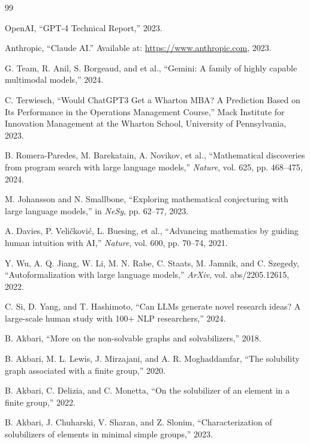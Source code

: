 \documentclass{article}
\begin{document}
\begin{thebibliography}{99}

OpenAI, “GPT-4 Technical Report,” 2023.

Anthropic, “Claude AI.” Available at: \url{https://www.anthropic.com}, 2023.

G. Team, R. Anil, S. Borgeaud, and et al., “Gemini: A family of highly capable multimodal models,” 2024.

C. Terwiesch, “Would ChatGPT3 Get a Wharton MBA? A Prediction Based on Its Performance in the Operations Management Course,” Mack Institute for Innovation Management at the Wharton School, University of Pennsylvania, 2023.

B. Romera-Paredes, M. Barekatain, A. Novikov, et al., “Mathematical discoveries from program search with large language models,” \emph{Nature}, vol. 625, pp. 468–475, 2024.

M. Johansson and N. Smallbone, “Exploring mathematical conjecturing with large language models,” in \emph{NeSy}, pp. 62–77, 2023.

A. Davies, P. Veličković, L. Buesing, et al., “Advancing mathematics by guiding human intuition with AI,” \emph{Nature}, vol. 600, pp. 70–74, 2021.

Y. Wu, A. Q. Jiang, W. Li, M. N. Rabe, C. Staats, M. Jamnik, and C. Szegedy, “Autoformalization with large language models,” \emph{ArXiv}, vol. abs/2205.12615, 2022.

C. Si, D. Yang, and T. Hashimoto, “Can LLMs generate novel research ideas? A large-scale human study with 100+ NLP researchers,” 2024.

B. Akbari, “More on the non-solvable graphs and solvabilizers,” 2018.

B. Akbari, M. L. Lewis, J. Mirzajani, and A. R. Moghaddamfar, “The solubility graph associated with a finite group,” 2020.

B. Akbari, C. Delizia, and C. Monetta, “On the solubilizer of an element in a finite group,” 2022.

B. Akbari, J. Chuharski, V. Sharan, and Z. Slonim, “Characterization of solubilizers of elements in minimal simple groups,” 2023.


\end{thebibliography}
\end{document}

